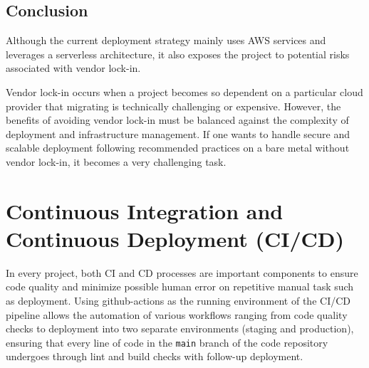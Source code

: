 \subsection{Conclusion}

Although the current deployment strategy mainly uses \ac{AWS} services and leverages a serverless architecture, it also exposes the project to potential risks associated with vendor lock-in. 

Vendor lock-in occurs when a project becomes so dependent on a particular cloud provider that migrating is technically challenging or expensive.
However, the benefits of avoiding vendor lock-in must be balanced against the complexity of deployment and infrastructure management.
If one wants to handle secure and scalable deployment following recommended practices on a bare metal without vendor lock-in, it becomes a very challenging task.



\section{Continuous Integration and Continuous Deployment (CI/CD)}
\label{sec:cicd}
In every project, both \ac{CI} and \ac{CD} processes are important components to ensure code quality and minimize possible human error on repetitive manual task such as deployment.
Using \gls{github-actions} as the running environment of the \ac{CI}/\ac{CD} pipeline allows the automation of various workflows ranging from code quality checks to deployment into two separate environments (staging and production), ensuring that every line of code in the \texttt{main} branch of the code repository undergoes through lint and build checks with follow-up deployment.


